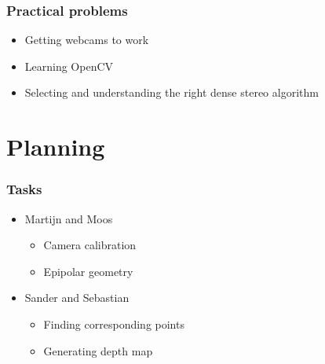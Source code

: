 \documentclass{beamer}
\begin{document}

\frame
{
  \frametitle{Practical problems}
  \begin{itemize}
   \item Getting webcams to work
   \item Learning OpenCV
   \item Selecting and understanding the right dense stereo algorithm
  \end{itemize}
}

\section{Planning}

\frame
{
  \frametitle{Tasks}
  \begin{itemize}
    \item Martijn and Moos
    \begin{itemize}
      \item Camera calibration
      \item Epipolar geometry
    \end{itemize}
    \item Sander and Sebastian
    \begin{itemize}
      \item Finding corresponding points
      \item Generating depth map
    \end{itemize}
  \end{itemize}
}
\end{document}
